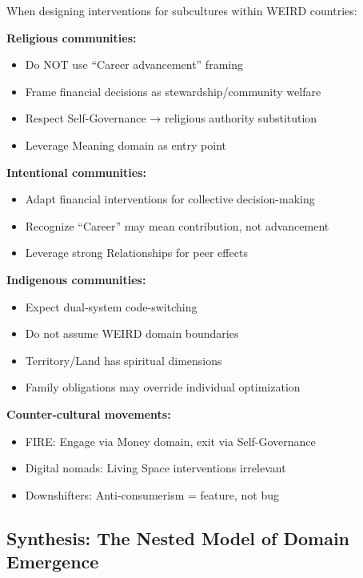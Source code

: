 \begin{tcolorbox}[colback=blue!5!white, colframe=blue!75!black, title=Practitioner Guidance: Subculture-Sensitive BCM]

When designing interventions for subcultures within WEIRD countries:

\textbf{Religious communities:}
\begin{itemize}[nosep]
\item Do NOT use ``Career advancement'' framing
\item Frame financial decisions as stewardship/community welfare
\item Respect Self-Governance → religious authority substitution
\item Leverage Meaning domain as entry point
\end{itemize}

\textbf{Intentional communities:}
\begin{itemize}[nosep]
\item Adapt financial interventions for collective decision-making
\item Recognize ``Career'' may mean contribution, not advancement
\item Leverage strong Relationships for peer effects
\end{itemize}

\textbf{Indigenous communities:}
\begin{itemize}[nosep]
\item Expect dual-system code-switching
\item Do not assume WEIRD domain boundaries
\item Territory/Land has spiritual dimensions
\item Family obligations may override individual optimization
\end{itemize}

\textbf{Counter-cultural movements:}
\begin{itemize}[nosep]
\item FIRE: Engage via Money domain, exit via Self-Governance
\item Digital nomads: Living Space interventions irrelevant
\item Downshifters: Anti-consumerism = feature, not bug
\end{itemize}

\end{tcolorbox}

\subsection{Synthesis: The Nested Model of Domain Emergence}

